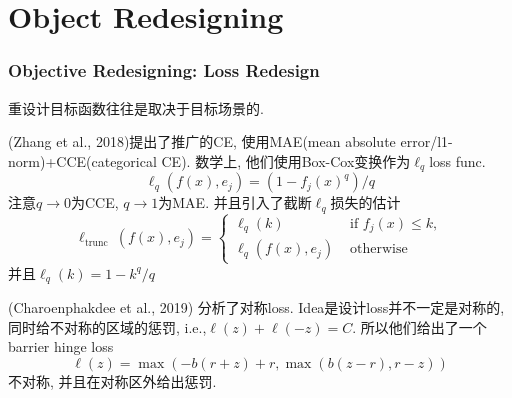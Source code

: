 \documentclass{beamer}
\newenvironment{remark}[1][Remark]{\begin{trivlist}
    \item[\hskip \labelsep {\bfseries #1}]}{\end{trivlist}}
\begin{document}
\section{Object Redesigning}

\begin{frame}
    \frametitle{Objective Redesigning: Loss Redesign}

    \begin{remark}
        重设计目标函数往往是取决于目标场景的.
    \end{remark}

    (Zhang et al., 2018)提出了推广的CE, 使用MAE(mean absolute error/l1-norm)+CCE(categorical CE). 数学上, 他们使用Box-Cox变换作为$\ell_q$loss func.
    \begin{equation}
        \ell_{q}\left(f(x), e_{j}\right)=\left(1-f_{j}(x)^{q}\right) / q
    \end{equation}
    注意$q\to 0$为CCE, $q\to1$为MAE.
    并且引入了截断$\ell_q$损失的估计
    \begin{equation}
        \ell_{\text {trunc }}\left(f(x), e_{j}\right)=\left\{\begin{array}{ll}
        \ell_{q}(k) & \text { if } f_{j}(x) \leq k, \\
        \ell_{q}\left(f(x), e_{j}\right) & \text { otherwise }
        \end{array}\right.
    \end{equation}
    并且$\ell_{q}(k)=1-k^{q} / q$

    (Charoenphakdee et al., 2019) 分析了对称loss. Idea是设计loss并不一定是对称的, 同时给不对称的区域的惩罚, i.e.,$\ell(z)+\ell(-z)=C$. 
    所以他们给出了一个barrier hinge loss
    \begin{equation}
        \ell(z)=\max (-b(r+z)+r, \max (b(z-r), r-z))
    \end{equation}
    不对称, 并且在对称区外给出惩罚.
\end{frame}
\end{document}
